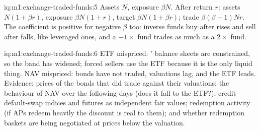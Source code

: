 \begin{solution}{iq:m1:exchange-traded-funds:5}
Assets $N$, exposure $\beta N$. After return $r$: assets $N(1+\beta r)$,
exposure $\beta N(1+r)$, target $\beta N(1+\beta r)$; trade $\beta(\beta-1)Nr$.
The coefficient is positive for negative $\beta$ too: inverse funds buy after
rises and sell after falls, like leveraged ones, and a $-1\times$ fund trades
as much as a $2\times$ fund.
\end{solution}

\begin{solution}{iq:m1:exchange-traded-funds:6}
ETF mispriced: ' balance sheets are constrained, so
the band has widened; forced sellers use the ETF because it is the only
liquid thing. NAV mispriced: bonds have not traded, valuations lag, and the
ETF leads. Evidence: prices of the bonds that did trade against their
valuations; the behaviour of NAV over the following days (does it fall to the
ETF?); credit-default-swap indices and futures as independent fair values;
redemption activity (if APs redeem heavily the discount is real to them); and
whether redemption baskets are being negotiated at prices below the
valuation.
\end{solution}
